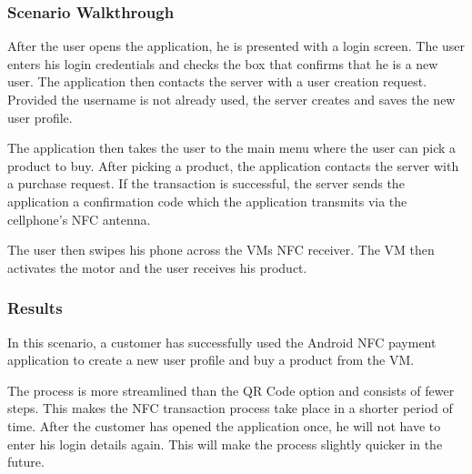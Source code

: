 \subsubsection{Scenario Walkthrough}

After the user opens the application, he is presented with a login screen. The
user enters his login credentials and checks the box that confirms that he is a
new user. The application then contacts the server with a user creation
request. Provided the username is not already used, the server creates and
saves the new user profile.

The application then takes the user to the main menu where the user can pick
a product to buy. After picking a product, the application contacts the server
with a purchase request. If the transaction is successful, the server sends the
application a confirmation code which the application transmits via the
cellphone's NFC antenna.

The user then swipes his phone across the VMs NFC receiver. The
VM then activates the motor and the user receives his product. 

\subsubsection{Results}

In this scenario, a customer has successfully used the Android NFC payment application to
create a new user profile and buy a product from the VM. 

The process is more streamlined than the QR Code option and consists of fewer steps. This
makes the NFC transaction process take place in a shorter period of time. After the
customer has opened the application once, he will not have to enter his login details
again. This will make the process slightly quicker in the future.  